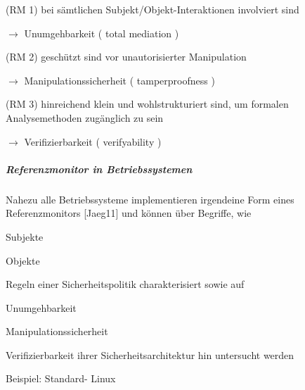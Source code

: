 \documentclass[a4paper]{article}
\begin{document}
\begin{multicols}{3}
    \begin{itemize*}
        \item
        (RM 1) bei sämtlichen Subjekt/Objekt-Interaktionen involviert sind
        \begin{itemize*}
            \item $\rightarrow$ Unumgehbarkeit ( total mediation )
        \end{itemize*}
        \item
        (RM 2) geschützt sind vor unautorisierter Manipulation
        \begin{itemize*}
            \item $\rightarrow$ Manipulationssicherheit ( tamperproofness )
        \end{itemize*}
        \item
        (RM 3) hinreichend klein und wohlstrukturiert sind, um formalen
        Analysemethoden zugänglich zu sein
        \begin{itemize*}
            \item $\rightarrow$ Verifizierbarkeit ( verifyability )
        \end{itemize*}
    \end{itemize*}


    \subparagraph{Referenzmonitor in
        Betriebssystemen}

    Nahezu alle Betriebssysteme implementieren irgendeine Form eines
    Referenzmonitors [Jaeg11] und können über Begriffe, wie

    \begin{itemize*}
        \item
        Subjekte
        \item
        Objekte
        \item
        Regeln einer Sicherheitspolitik charakterisiert sowie auf
        \item
        Unumgehbarkeit
        \item
        Manipulationssicherheit
        \item
        Verifizierbarkeit ihrer Sicherheitsarchitektur hin untersucht werden
    \end{itemize*}

    Beispiel: Standard- Linux


\end{multicols}
\end{document}
